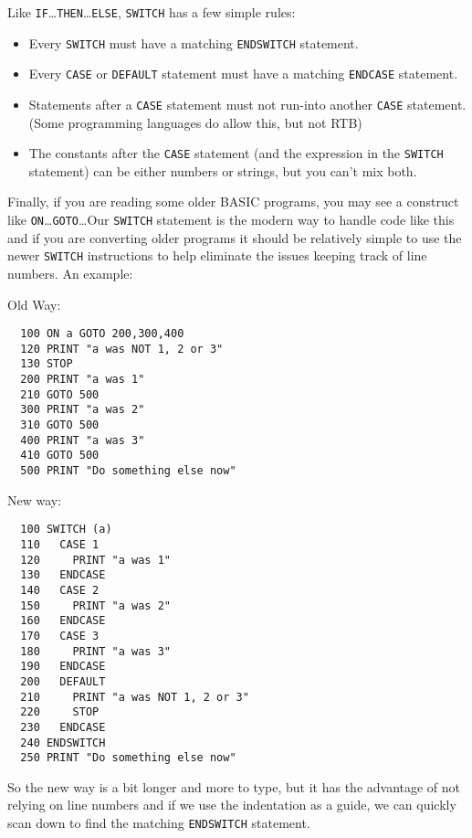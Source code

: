 Like {\tt IF}\dots {\tt THEN}\dots {\tt ELSE}, {\tt SWITCH} has a few
simple rules:
\begin{itemize}
\item Every {\tt SWITCH} must have a matching {\tt ENDSWITCH} statement.
\item Every {\tt CASE} or {\tt DEFAULT} statement must have a matching
{\tt ENDCASE} statement.
\item Statements after a {\tt CASE} statement must not run-into another
{\tt CASE} statement. (Some programming languages do allow this, but not RTB)
\item The constants after the {\tt CASE} statement (and the expression
in the {\tt SWITCH} statement) can be either numbers or strings, but
you can't mix both.
\end{itemize}

Finally, if you are reading some older BASIC programs, you may see a
construct like {\tt ON}\dots{\tt GOTO}\dots Our {\tt SWITCH} statement is
the modern way to handle code like this and if you are converting older
programs it should be relatively simple to use the newer {\tt SWITCH}
instructions to help eliminate the issues keeping track of line numbers.  
An example:

Old Way:
\begin{verbatim}
  100 ON a GOTO 200,300,400
  120 PRINT "a was NOT 1, 2 or 3"
  130 STOP
  200 PRINT "a was 1"
  210 GOTO 500
  300 PRINT "a was 2"
  310 GOTO 500
  400 PRINT "a was 3"
  410 GOTO 500
  500 PRINT "Do something else now"
\end{verbatim}
\begin{samepage}
New way:
\begin{verbatim}
  100 SWITCH (a)
  110   CASE 1
  120     PRINT "a was 1"
  130   ENDCASE
  140   CASE 2
  150     PRINT "a was 2"
  160   ENDCASE
  170   CASE 3
  180     PRINT "a was 3"
  190   ENDCASE
  200   DEFAULT
  210     PRINT "a was NOT 1, 2 or 3"
  220     STOP
  230   ENDCASE
  240 ENDSWITCH
  250 PRINT "Do something else now"
\end{verbatim}
\end{samepage}
So the new way is a bit longer and more to type, but it has the advantage
of not relying on line numbers and if we use the indentation as a guide,
we can quickly scan down to find the matching {\tt ENDSWITCH} statement.
